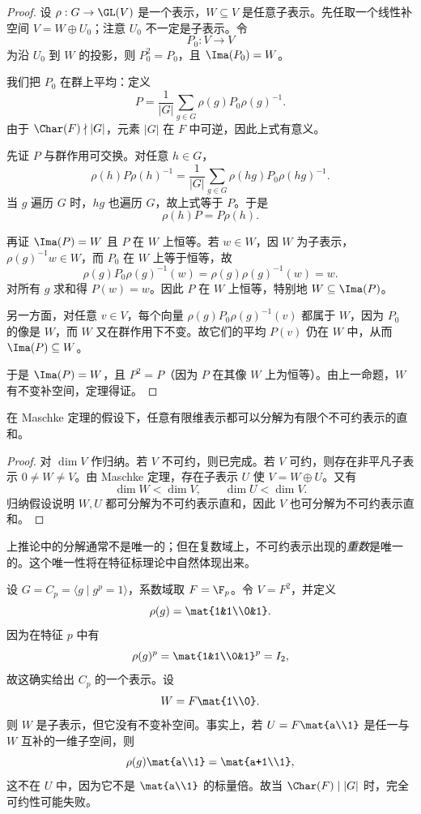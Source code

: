\begin{proof}
设 $\rho:G\to \GL(V)$ 是一个表示，$W\subseteq V$ 是任意子表示。先任取一个线性补空间 $V=W\oplus U_0$；注意 $U_0$ 不一定是子表示。令
\[
P_0:V\to V
\]
为沿 $U_0$ 到 $W$ 的投影，则 $P_0^2=P_0$，且 $\Ima(P_0)=W$。

我们把 $P_0$ 在群上平均：定义
\[
P=\frac{1}{|G|}\sum_{g\in G}\rho(g)P_0\rho(g)^{-1}.
\]
由于 $\Char(F)\nmid |G|$，元素 $|G|$ 在 $F$ 中可逆，因此上式有意义。

先证 $P$ 与群作用可交换。对任意 $h\in G$，
\[
\rho(h)P\rho(h)^{-1}
=\frac{1}{|G|}\sum_{g\in G}\rho(hg)P_0\rho(hg)^{-1}.
\]
当 $g$ 遍历 $G$ 时，$hg$ 也遍历 $G$，故上式等于 $P$。于是
\[
\rho(h)P=P\rho(h).
\]

再证 $\Ima(P)=W$ 且 $P$ 在 $W$ 上恒等。若 $w\in W$，因 $W$ 为子表示，$\rho(g)^{-1}w\in W$，而 $P_0$ 在 $W$ 上等于恒等，故
\[
\rho(g)P_0\rho(g)^{-1}(w)=\rho(g)\rho(g)^{-1}(w)=w.
\]
对所有 $g$ 求和得 $P(w)=w$。因此 $P$ 在 $W$ 上恒等，特别地 $W\subseteq \Ima(P)$。

另一方面，对任意 $v\in V$，每个向量 $\rho(g)P_0\rho(g)^{-1}(v)$ 都属于 $W$，因为 $P_0$ 的像是 $W$，而 $W$ 又在群作用下不变。故它们的平均 $P(v)$ 仍在 $W$ 中，从而 $\Ima(P)\subseteq W$。

于是 $\Ima(P)=W$，且 $P^2=P$（因为 $P$ 在其像 $W$ 上为恒等）。由上一命题，$W$ 有不变补空间，定理得证。
\end{proof}

\begin{corollary}
在 Maschke 定理的假设下，任意有限维表示都可以分解为有限个不可约表示的直和。
\end{corollary}

\begin{proof}
对 $\dim V$ 作归纳。若 $V$ 不可约，则已完成。若 $V$ 可约，则存在非平凡子表示 $0\neq W\neq V$。由 Maschke 定理，存在子表示 $U$ 使 $V=W\oplus U$。又有
\[
\dim W<\dim V,\qquad \dim U<\dim V.
\]
归纳假设说明 $W,U$ 都可分解为不可约表示直和，因此 $V$ 也可分解为不可约表示直和。
\end{proof}

\begin{remark}
上推论中的分解通常不是唯一的；但在复数域上，不可约表示出现的\emph{重数}是唯一的。这个唯一性将在特征标理论中自然体现出来。
\end{remark}

\begin{example}
设 $G=C_p=\langle g\mid g^p=1\rangle$，系数域取 $F=\F_p$。令 $V=F^2$，并定义
\[
\rho(g)=\mat{1&1\\0&1}.
\]
因为在特征 $p$ 中有
\[
\rho(g)^p=\mat{1&1\\0&1}^p=I_2,
\]
故这确实给出 $C_p$ 的一个表示。设
\[
W=F\mat{1\\0}.
\]
则 $W$ 是子表示，但它没有不变补空间。事实上，若 $U=F\mat{a\\1}$ 是任一与 $W$ 互补的一维子空间，则
\[
\rho(g)\mat{a\\1}=\mat{a+1\\1},
\]
这不在 $U$ 中，因为它不是 $\mat{a\\1}$ 的标量倍。故当 $\Char(F)\mid |G|$ 时，完全可约性可能失败。
\end{example}

